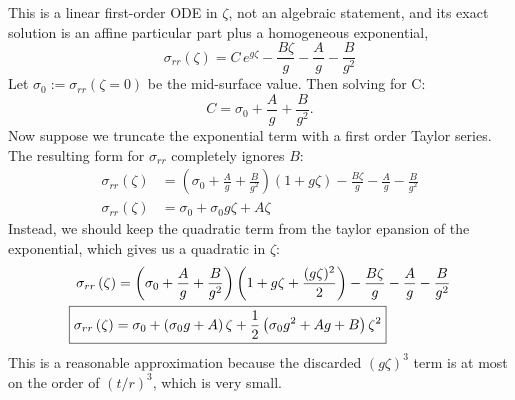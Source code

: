 \documentclass[11pt]{article}
\begin{document}
This is a linear first-order ODE in $\zeta$, not an algebraic statement, and its
exact solution is an affine particular part plus a homogeneous exponential,
\begin{equation}\label{eq:srr_exact}
    \sigma_{rr}\left(\zeta\right)
      = C\,e^{g\zeta}
        - \frac{B\zeta}{g} - \frac{A}{g} - \frac{B}{g^2}
\end{equation}
Let $\sigma_0 := \sigma_{rr}\left(\zeta = 0\right)$ be the mid-surface value. Then solving for C:
\begin{equation}\label{eq:C_from_sigma0}
    C = \sigma_0 + \frac{A}{g} + \frac{B}{g^{2}}.
\end{equation}
Now suppose we truncate the exponential term with a first order Taylor series. The resulting form for $\sigma_{rr}$ completely ignores $B$:
\begin{align}
    \sigma_{rr}\left(\zeta\right) &= \left(\sigma_0 + \frac{A}{g} + \frac{B}{g^{2}}\right)\left(1+g\zeta\right)- \frac{B\zeta}{g} - \frac{A}{g} - \frac{B}{g^2}\\
    \sigma_{rr}\left(\zeta\right) &= \sigma_0 + \sigma_0 g \zeta + A\zeta
\end{align}
Instead, we should keep the quadratic term from the taylor epansion of the exponential, which gives us a quadratic in $\zeta$:
\begin{align}
    \sigma_{rr}\left(\zeta\right) &= \left(\sigma_0 + \frac{A}{g} + \frac{B}{g^{2}}\right)\left(1+g\zeta + \frac{(g\zeta)^2}{2}\right)- \frac{B\zeta}{g} - \frac{A}{g} - \frac{B}{g^2}\\
    \Aboxed{\sigma_{rr}\left(\zeta\right) &= \sigma_0 + \left(\sigma_0 g + A\right)\zeta + \frac{1}{2}\left(\sigma_0 g^2 + Ag + B\right)\zeta^2\label{eq:srr_taylor}}
\end{align}
This is a reasonable approximation because the discarded $(g\zeta)^3$ term is at most on the order of $(t/r)^3$, which is very small.
\end{document}

